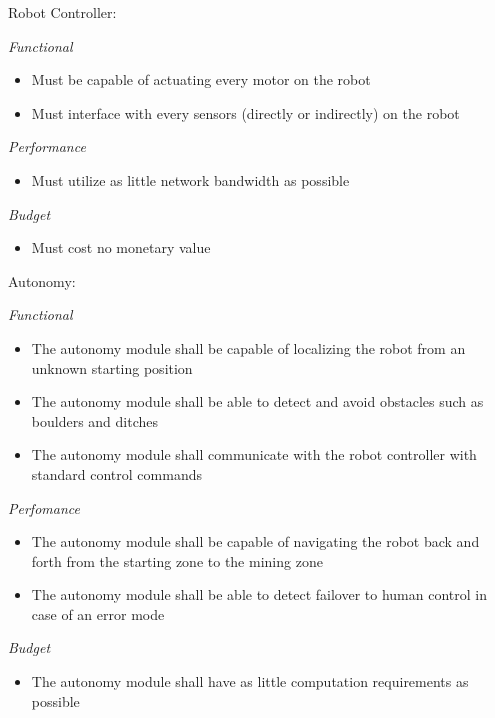 \documentclass[class=article, crop=false]{standalone}
\begin{document}
\noindent
\normalsize
Robot Controller:
\footnotesize

\vspace*{0.05in}
\noindent
\emph{Functional}
\begin{itemize}
 \item Must be capable of actuating every motor on the robot
 \item Must interface with every sensors (directly or indirectly) on the robot
\end{itemize}
\emph{Performance}
\begin{itemize}
 \item Must utilize as little network bandwidth as possible
\end{itemize}
\noindent
\emph{Budget}
\begin{itemize}
 \item Must cost no monetary value
\end{itemize}

\vspace*{0.1in}

\noindent
\normalsize
Autonomy:
\footnotesize
\vspace*{0.05in}

\noindent
\emph{Functional}
\begin{itemize}
 \item The autonomy module shall be capable of localizing the robot from an unknown starting position
 \item The autonomy module shall be able to detect and avoid obstacles such as boulders and ditches
 \item The autonomy module shall communicate with the robot controller with standard control commands
\end{itemize}

\noindent
\emph{Perfomance}
\begin{itemize}
 \item The autonomy module shall be capable of navigating the robot back and forth from the starting zone to the mining zone
 \item The autonomy module shall be able to detect failover to human control in case of an error mode
\end{itemize}

\noindent
\emph{Budget}
\begin{itemize}
 \item The autonomy module shall have as little computation requirements as possible
\end{itemize}
\end{document}
